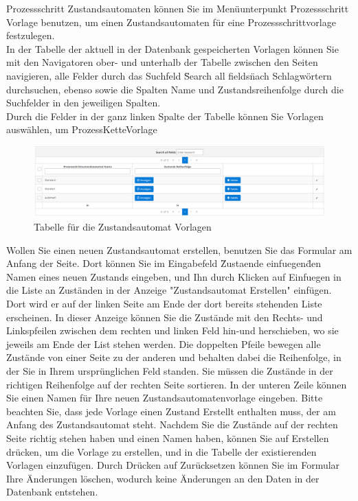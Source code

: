 \documentclass[enabledeprecatedfontcommands,fontsize=12pt,paper=a4,twoside]{scrartcl}
\begin{document}
Prozessschritt Zustandsautomaten können Sie im Menüunterpunkt Prozessschritt Vorlage benutzen, um einen Zustandsautomaten für eine Prozessschrittvorlage festzulegen. \\

In der Tabelle der aktuell in der Datenbank gespeicherten Vorlagen können Sie mit den Navigatoren ober- und unterhalb der Tabelle zwischen den Seiten navigieren, alle Felder durch das Suchfeld \"Search all fields\" nach Schlagwörtern durchsuchen, ebenso sowie die Spalten Name und Zustandsreihenfolge durch die Suchfelder in den jeweiligen Spalten. \\
Durch die Felder in der ganz linken Spalte der Tabelle können Sie Vorlagen auswählen, um ProzessKetteVorlage\\

\begin{figure}[h!]
\begin{center}
 \includegraphics[width=\textwidth]{screenshots/pk/prozessschrittzustandsautomatvorlageubersicht.png}
  \caption{Tabelle für die Zustandsautomat Vorlagen}
  \label{fig:boat2}
\end{center}
\end{figure}

Wollen Sie einen neuen Zustandsautomat erstellen, benutzen Sie das Formular am Anfang der Seite. Dort können Sie im Eingabefeld \"Zustaende einfuegen\" den Namen eines neuen Zustands eingeben, und Ihn durch Klicken auf Einfuegen in die Liste an Zuständen in der Anzeige "Zustandsautomat Erstellen" einfügen. Dort wird er auf der linken Seite am Ende der dort bereits stehenden Liste erscheinen. In dieser Anzeige können Sie die Zustände mit den Rechts- und Linkspfeilen zwischen dem rechten und linken Feld hin-und herschieben, wo sie jeweils am Ende der List stehen werden. Die doppelten Pfeile bewegen alle Zustände von einer Seite zu der anderen und behalten dabei die Reihenfolge, in der Sie in Ihrem ursprünglichen Feld standen. Sie müssen die Zustände in der richtigen Reihenfolge auf der rechten Seite sortieren. In der unteren Zeile können Sie einen Namen für Ihre neuen Zustandsautomatenvorlage eingeben. Bitte beachten Sie, dass jede Vorlage einen Zustand Erstellt enthalten muss, der am Anfang des Zustandsautomat steht. 
Nachdem Sie die Zustände auf der rechten Seite richtig stehen haben und einen Namen haben, können Sie auf Erstellen drücken, um die Vorlage zu erstellen, und in die Tabelle der existierenden Vorlagen einzufügen. Durch Drücken auf Zurücksetzen können Sie im Formular Ihre Änderungen löschen, wodurch keine Änderungen an den Daten in der Datenbank entstehen. \\
\end{document}
